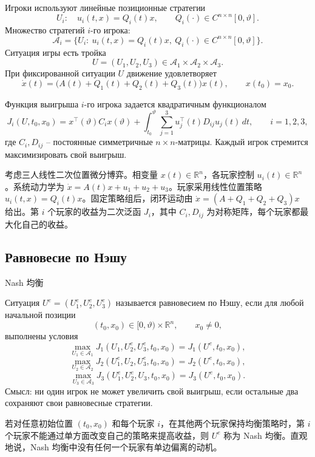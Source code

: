 \documentclass[12pt,a4paper]{article}
\newcommand{\R}{\mathbb{R}}
\newcommand{\zh}[1]{\par\noindent #1\par}
\begin{document}
Игроки используют линейные позиционные стратегии
\[
U_i:\quad u_i(t,x)=Q_i(t)x,\qquad Q_i(\cdot)\in C^{n\times n}[0,\vartheta].
\]
Множество стратегий \(i\)-го игрока:
\[
\mathcal A_i=\{U_i:\ u_i(t,x)=Q_i(t)x,\ Q_i(\cdot)\in C^{n\times n}[0,\vartheta]\}.
\]
Ситуация игры есть тройка
\[
U=(U_1,U_2,U_3)\in \mathcal A_1\times\mathcal A_2\times\mathcal A_3.
\]
При фиксированной ситуации \(U\) движение удовлетворяет
\[
\dot x(t)=\bigl(A(t)+Q_1(t)+Q_2(t)+Q_3(t)\bigr)x(t),\qquad x(t_0)=x_0.
\]

Функция выигрыша \(i\)-го игрока задается квадратичным функционалом
\[
J_i(U,t_0,x_0)=x^{\top}(\vartheta)C_i x(\vartheta)+
\int_{t_0}^{\vartheta}\sum_{j=1}^3 u_j^{\top}(t)D_{ij}u_j(t)\,dt,
\qquad i=1,2,3,
\]
где \(C_i,D_{ij}\) -- постоянные симметричные \(n\times n\)-матрицы. Каждый игрок стремится максимизировать свой выигрыш.
\zh{考虑三人线性二次位置微分博弈。相变量 \(x(t)\in\R^n\)，各玩家控制 \(u_i(t)\in\R^n\)。系统动力学为 \(\dot x=A(t)x+u_1+u_2+u_3\)。玩家采用线性位置策略 \(u_i(t,x)=Q_i(t)x\)。固定策略组后，闭环运动由 \(\dot x=(A+Q_1+Q_2+Q_3)x\) 给出。第 \(i\) 个玩家的收益为二次泛函 \(J_i\)，其中 \(C_i,D_{ij}\) 为对称矩阵，每个玩家都最大化自己的收益。}


\subsection*{Равновесие по Нэшу}
\zh{Nash 均衡}
Ситуация \(U^e=(U_1^e,U_2^e,U_3^e)\) называется равновесием по Нэшу, если для любой начальной позиции
\[
(t_0,x_0)\in [0,\vartheta)\times\R^n,\qquad x_0\ne 0,
\]
выполнены условия
\[
\max_{U_1\in\mathcal A_1}J_1(U_1,U_2^e,U_3^e,t_0,x_0)=J_1(U^e,t_0,x_0),
\]
\[
\max_{U_2\in\mathcal A_2}J_2(U_1^e,U_2,U_3^e,t_0,x_0)=J_2(U^e,t_0,x_0),
\]
\[
\max_{U_3\in\mathcal A_3}J_3(U_1^e,U_2^e,U_3,t_0,x_0)=J_3(U^e,t_0,x_0).
\]
Смысл: ни один игрок не может увеличить свой выигрыш, если остальные два сохраняют свои равновесные стратегии.
\zh{若对任意初始位置 \((t_0,x_0)\) 和每个玩家 \(i\)，在其他两个玩家保持均衡策略时，第 \(i\) 个玩家不能通过单方面改变自己的策略来提高收益，则 \(U^e\) 称为 Nash 均衡。直观地说，Nash 均衡中没有任何一个玩家有单边偏离的动机。}

\end{document}
